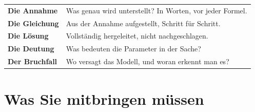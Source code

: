 \begin{warnung}
\begin{center}
\renewcommand{\arraystretch}{1.5}
\begin{tabular}{@{}P{2.4cm}P{6.2cm}@{}}
\toprule
\textbf{Die Annahme} & Was genau wird unterstellt? In Worten, vor jeder Formel.\\
\textbf{Die Gleichung} & Aus der Annahme aufgestellt, Schritt für Schritt.\\
\textbf{Die Lösung} & Vollständig hergeleitet, nicht nachgeschlagen.\\
\textbf{Die Deutung} & Was bedeuten die Parameter in der Sache?\\
\textbf{Der Bruchfall} & Wo versagt das Modell, und woran erkennt man es?\\
\bottomrule
\end{tabular}
\end{center}

\begin{center}
\begin{minipage}{0.88\textwidth}
\end{minipage}
\end{center}
\end{warnung}

\section*{Was Sie mitbringen müssen}

